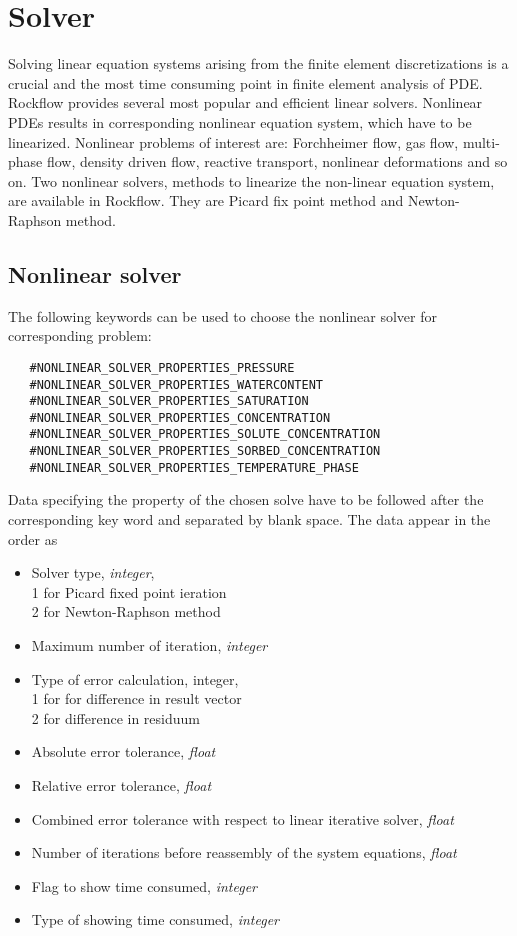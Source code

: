 \section{Solver}
Solving linear equation systems arising from the finite element discretizations is a crucial and the most time consuming
point in finite element analysis of PDE. Rockflow provides several most popular and efficient linear solvers.
Nonlinear PDEs results in corresponding nonlinear equation system, which have to be linearized. Nonlinear problems of interest are: Forchheimer flow, gas flow, multi-phase flow, density driven flow, reactive
transport, nonlinear deformations and so on. Two nonlinear solvers, methods to linearize the non-linear equation system,
are available in Rockflow. They are Picard fix point method and Newton-Raphson method.

\subsection{Nonlinear solver}
The following keywords can be used to choose the nonlinear solver for corresponding problem:
\begin{center}
  \begin{verbatim}
   #NONLINEAR_SOLVER_PROPERTIES_PRESSURE
   #NONLINEAR_SOLVER_PROPERTIES_WATERCONTENT
   #NONLINEAR_SOLVER_PROPERTIES_SATURATION
   #NONLINEAR_SOLVER_PROPERTIES_CONCENTRATION
   #NONLINEAR_SOLVER_PROPERTIES_SOLUTE_CONCENTRATION
   #NONLINEAR_SOLVER_PROPERTIES_SORBED_CONCENTRATION
   #NONLINEAR_SOLVER_PROPERTIES_TEMPERATURE_PHASE
 \end{verbatim}
\end{center}

Data specifying the property of the chosen solve have to be followed after the corresponding key word and separated
by blank space. The data appear in the order as


\begin{itemize}
    \item Solver type, \emph {integer},\\
       1 for Picard fixed point ieration\\
       2 for Newton-Raphson method
    \item Maximum number of iteration,  \emph {integer}
    \item Type of error calculation, integer,\\
        1 for for difference in result vector\\
        2 for difference in residuum
    \item Absolute error tolerance,  \emph {float}
    \item Relative error tolerance,  \emph {float}
    \item Combined error tolerance with respect to linear iterative solver,  \emph {float}
    \item Number of iterations before reassembly of the system equations,  \emph {float}
    \item Flag to show time consumed,  \emph {integer}
    \item Type of showing time consumed,  \emph {integer}
\end{itemize}

